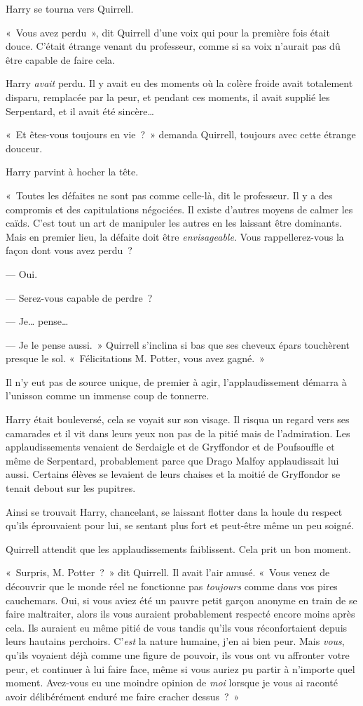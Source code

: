 Harry se tourna vers Quirrell.

«~Vous avez perdu~», dit Quirrell d'une voix qui pour la première fois était douce.
C'était étrange venant du professeur, comme si sa voix n'aurait pas dû être capable de faire cela.

Harry \emph{avait} perdu.
Il y avait eu des moments où la colère froide avait totalement disparu, remplacée par la peur, et pendant ces moments, il avait supplié les Serpentard, et il avait été sincère…

«~Et êtes-vous toujours en vie~?~»
demanda Quirrell, toujours avec cette étrange douceur.

Harry parvint à hocher la tête.

«~Toutes les défaites ne sont pas comme celle-là, dit le professeur.
Il y a des compromis et des capitulations négociées.
Il existe d'autres moyens de calmer les caïds.
C'est tout un art de manipuler les autres en les laissant être dominants.
Mais en premier lieu, la défaite doit être \emph{envisageable}.
Vous rappellerez-vous la façon dont vous avez perdu~?

--- Oui.

--- Serez-vous capable de perdre~?

--- Je… pense…

--- Je le pense aussi.~»
Quirrell s'inclina si bas que ses cheveux épars touchèrent presque le sol.
«~Félicitations M. Potter, vous avez gagné.~»

Il n'y eut pas de source unique, de premier à agir, l'applaudissement démarra à l'unisson comme un immense coup de tonnerre.

Harry était bouleversé, cela se voyait sur son visage.
Il risqua un regard vers ses camarades et il vit dans leurs yeux non pas de la pitié mais de l'admiration.
Les applaudissements venaient de Serdaigle et de Gryffondor et de Poufsouffle et même de Serpentard, probablement parce que Drago Malfoy applaudissait lui aussi.
Certains élèves se levaient de leurs chaises et la moitié de Gryffondor se tenait debout sur les pupitres.

Ainsi se trouvait Harry, chancelant, se laissant flotter dans la houle du respect qu'ils éprouvaient pour lui, se sentant plus fort et peut-être même un peu soigné.

Quirrell attendit que les applaudissements faiblissent.
Cela prit un bon moment.

«~Surpris, M. Potter~?~» dit Quirrell.
Il avait l'air amusé.
«~Vous venez de découvrir que le monde réel ne fonctionne pas \emph{toujours} comme dans vos pires cauchemars.
Oui, si vous aviez été un pauvre petit garçon anonyme en train de se faire maltraiter, alors ils vous auraient probablement respecté encore moins après cela.
Ils auraient eu même pitié de vous tandis qu'ils vous réconfortaient depuis leurs hautains perchoirs.
C'\emph{est} la nature humaine, j'en ai bien peur.
Mais \emph{vous}, qu'ils voyaient déjà comme une figure de pouvoir,
ils vous ont vu affronter votre peur, et continuer à lui faire face, même si vous auriez pu partir à n'importe quel moment.
Avez-vous eu une moindre opinion de \emph{moi} lorsque je vous ai raconté avoir délibérément enduré me faire cracher dessus~?~»

